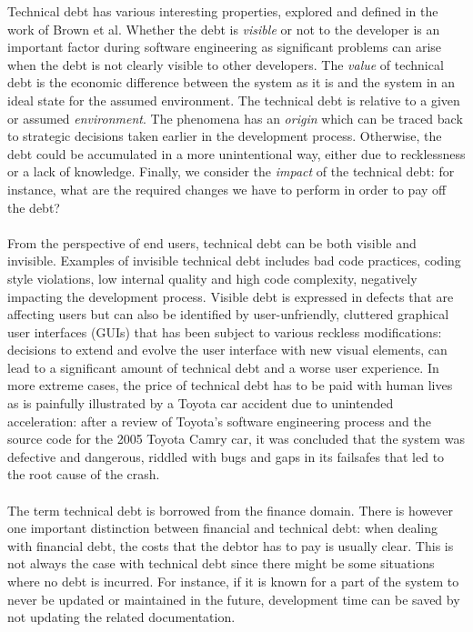 Technical debt has various interesting properties, explored and defined in the work of Brown et al\cite{brown2010managing}. 
Whether the debt is \emph{visible} or not to the developer is an important factor during software engineering as significant problems can arise when the debt is not clearly visible to other developers.
The \emph{value} of technical debt is the economic difference between the system as it is and the system in an ideal state for the assumed environment.
The technical debt is relative to a given or assumed \emph{environment}.
The phenomena has an \emph{origin} which can be traced back to strategic decisions taken earlier in the development process. Otherwise, the debt could be accumulated in a more unintentional way, either due to recklessness or a lack of knowledge.
Finally, we consider the \emph{impact} of the technical debt: for instance, what are the required changes we have to perform in order to pay off the debt?\\\\
From the perspective of end users, technical debt can be both visible and invisible\cite{kruchten2012technical}.
Examples of invisible technical debt includes bad code practices, coding style violations, low internal quality and high code complexity, negatively impacting the development process.
Visible debt is expressed in defects that are affecting users but can also be identified by user-unfriendly, cluttered graphical user interfaces (GUIs) that has been subject to various reckless modifications: decisions to extend and evolve the user interface with new visual elements, can lead to a significant amount of technical debt and a worse user experience.
In more extreme cases, the price of technical debt has to be paid with human lives as is painfully illustrated by a Toyota car accident due to unintended acceleration: after a review of Toyota’s software engineering process and the source code for the 2005 Toyota Camry car, it was concluded that the system was defective and dangerous, riddled with bugs and gaps in its failsafes that led to the root cause of the crash\cite{toyotatechnicaldebt}.\\\\
The term technical debt is borrowed from the finance domain\cite{guo2011portfolio}.
There is however one important distinction between financial and technical debt: when dealing with financial debt, the costs that the debtor has to pay is usually clear.
This is not always the case with technical debt since there might be some situations where no debt is incurred.
For instance, if it is known for a part of the system to never be updated or maintained in the future, development time can be saved by not updating the related documentation.
